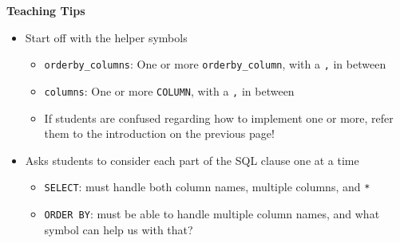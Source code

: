 \begin{guide}
\begin{blocksection}
\textbf{Teaching Tips}
\begin{itemize}
  \item Start off with the helper symbols
  \begin{itemize}
    \item \lstinline{orderby_columns}: One or more \lstinline{orderby_column}, with a \lstinline{,} in between
    \item \lstinline{columns}: One or more \lstinline{COLUMN}, with a \lstinline{,} in between
    \item If students are confused regarding how to implement one or more, refer them to the introduction on the previous page!
  \end{itemize}
  \item Asks students to consider each part of the SQL clause one at a time
  \begin{itemize}
    \item \lstinline{SELECT}: must handle both column names, multiple columns, and \lstinline{*}
    \item \lstinline{ORDER BY}: must be able to handle multiple column names, and what symbol can help us with that?
  \end{itemize}
\end{itemize}
\end{blocksection}
\end{guide}
